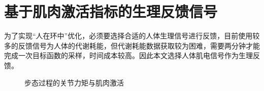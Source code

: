 \section{基于肌肉激活指标的生理反馈信号}

为了实现“人在环中”优化，必须要选择合适的人体生理信号进行反馈，目前使用较多的反馈信号为人体的代谢耗能，但代谢耗能数据获取较为困难，需要两分钟才能完成一次目标函数的采样，时间成本较高。因此本文选择人体肌电信号作为生理反馈。
\begin{figure}[htb]
    \caption{步态过程的关节力矩与肌肉激活\cite{p44}}
    \label{fig:subfigss}
\end{figure}

